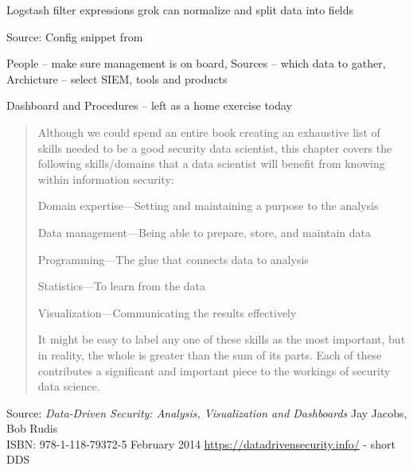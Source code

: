 \documentclass[Screen16to9,17pt]{foils}
\begin{document}
\begin{list2}
\item Logstash filter expressions grok can normalize and split data into fields
\end{list2}

Source:
Config snippet from\\
{\small{}}





\begin{list2}
\item People -- make sure management is on board, Sources -- which data to gather, Archicture -- select SIEM, tools and products
\item Dashboard and Procedures -- left as a home exercise today
\end{list2}




\begin{quote}
Although we could spend an entire book creating an exhaustive list of skills needed to be a good security data scientist, this chapter covers the following skills/domains that a data scientist will benefit from
knowing within information security:
\begin{list2}
\item Domain expertise—Setting and maintaining a purpose to the analysis
\item Data management—Being able to prepare, store, and maintain data
\item Programming—The glue that connects data to analysis
\item Statistics—To learn from the data
\item Visualization—Communicating the results effectively
\end{list2}
It might be easy to label any one of these skills as the most important, but in reality, the whole is greater than the sum of its parts. Each of these contributes a significant and important piece to the workings of
security data science.
\end{quote}

Source: \emph{Data-Driven Security: Analysis, Visualization and Dashboards} Jay Jacobs, Bob Rudis\\
ISBN: 978-1-118-79372-5 February 2014 \url{https://datadrivensecurity.info/} - short DDS
\end{document}
